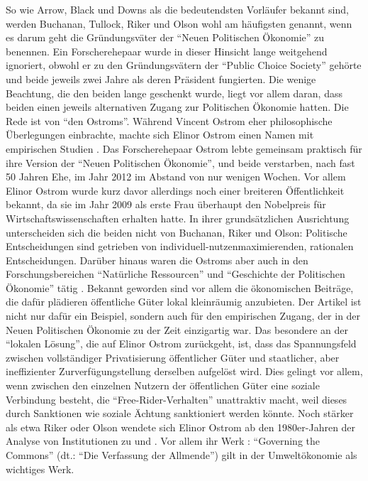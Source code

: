 So wie Arrow, Black und Downs als die bedeutendsten Vorläufer bekannt sind, werden Buchanan, Tullock, Riker und Olson wohl am häufigsten genannt, wenn es darum geht die Gründungsväter der "`Neuen Politischen Ökonomie"' zu benennen. Ein Forscherehepaar wurde in dieser Hinsicht lange weitgehend ignoriert, obwohl er zu den Gründungsvätern der "`Public Choice Society"' gehörte und beide jeweils zwei Jahre als deren Präsident fungierten. Die wenige Beachtung, die den beiden lange geschenkt wurde, liegt vor allem daran, dass beiden einen jeweils alternativen Zugang zur Politischen Ökonomie hatten. Die Rede ist von "`den Ostroms"'. Während Vincent Ostrom eher philosophische Überlegungen einbrachte, machte sich Elinor Ostrom einen Namen mit empirischen Studien \parencite[S. 110]{Mitchell1988}. Das Forscherehepaar Ostrom lebte gemeinsam praktisch für ihre Version der "`Neuen Politischen Ökonomie"', und beide verstarben, nach fast 50 Jahren Ehe, im Jahr 2012 im Abstand von nur wenigen Wochen. Vor allem Elinor Ostrom wurde kurz davor allerdings noch einer breiteren Öffentlichkeit bekannt, da sie im Jahr 2009 als erste Frau überhaupt den Nobelpreis für Wirtschaftswissenschaften erhalten hatte. In ihrer grundsätzlichen Ausrichtung unterscheiden sich die beiden nicht von Buchanan, Riker und Olson: Politische Entscheidungen sind getrieben von individuell-nutzenmaximierenden, rationalen Entscheidungen. Darüber hinaus waren die  Ostroms aber auch in den Forschungsbereichen "`Natürliche Ressourcen"' und "`Geschichte der Politischen Ökonomie"' tätig \textcite[S. 111]{Mitchell1988}. Bekannt geworden sind vor allem die ökonomischen Beiträge, die dafür plädieren öffentliche Güter lokal kleinräumig anzubieten. Der Artikel \textcite{Ostrom1973} ist nicht nur dafür ein Beispiel, sondern auch für den empirischen Zugang, der in der Neuen Politischen Ökonomie zu der Zeit einzigartig war. Das besondere an der "`lokalen Lösung"', die auf Elinor Ostrom zurückgeht, ist, dass das Spannungsfeld zwischen vollständiger Privatisierung öffentlicher Güter und staatlicher, aber ineffizienter Zurverfügungstellung derselben aufgelöst wird. Dies gelingt vor allem, wenn zwischen den einzelnen Nutzern der öffentlichen Güter eine soziale Verbindung besteht, die "`Free-Rider-Verhalten"' unattraktiv macht, weil dieses durch Sanktionen wie soziale Ächtung sanktioniert werden könnte. 
Noch stärker als etwa Riker oder Olson wendete sich Elinor Ostrom ab den 1980er-Jahren der Analyse von Institutionen zu \parencite{Ostrom1986} und \parencite{Ostrom1990}. Vor allem ihr Werk \textcite{Ostrom1990}: "`Governing the Commons"' (dt.: "`Die Verfassung der Allmende"') gilt in der Umweltökonomie als wichtiges Werk.


